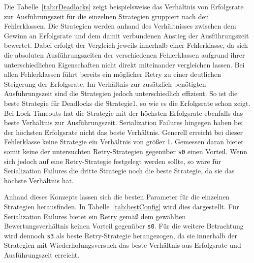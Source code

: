 Die Tabelle~\ref{tab:rDeadlocks} zeigt beispielsweise das Verhältnis von Erfolgsrate zur Ausführungszeit für die
einzelnen Strategien gruppiert nach den Fehlerklassen.
Die Strategien werden anhand des Verhältnisses zwischen dem Gewinn an Erfolgsrate und dem damit verbundenen Anstieg
der Ausführungszeit bewertet.
Dabei erfolgt der Vergleich jeweils innerhalb einer Fehlerklasse, da sich die absoluten Ausführungszeiten der
verschiedenen Fehlerklassen aufgrund ihrer unterschiedlichen Eigenschaften nicht direkt miteinander
vergleichen lassen.
Bei allen Fehlerklassen führt bereits ein möglicher Retry zu einer deutlichen Steigerung der Erfolgsrate.
Im Verhältnis zur zusätzlich benötigten Ausführungszeit sind die Strategien jedoch unterschiedlich effizient.
So ist die beste Strategie für Deadlocks die Strategie1, so wie es die Erfolgsrate schon zeigt.
Bei Lock Timeouts hat die Strategie mit der höchsten Erfolgsrate ebenfalls das beste Verhältnis zur Ausführungszeit.
Serialization Failures hingegen haben bei der höchsten Erfolgsrate nicht das beste Verhältnis.
Generell erreicht bei dieser Fehlerklasse keine Strategie ein Verhältnis von größer 1.
Gemessen daran bietet somit keine der untersuchten Retry-Strategien gegenüber \texttt{s0} einen Vorteil.
Wenn sich jedoch auf eine Retry-Strategie festgelegt werden sollte, so wäre für Serialization Failures die dritte
Strategie noch die beste Strategie, da sie das höchste Verhältnis hat.

Anhand dieses Konzepts lassen sich die besten Parameter für die einzelnen Strategien herausfinden.
In Tabelle~\ref{tab:bestConfig} wird dies dargestellt.
Für Serialization Failures bietet ein Retry gemäß dem gewählten Bewertungsverhältnis keinen Vorteil gegenüber
\texttt{s0}.
Für die weitere Betrachtung wird dennoch \texttt{s3} als beste Retry-Strategie herangezogen, da sie innerhalb der
Strategien mit Wiederholungsversuch das beste Verhältnis aus Erfolgsrate und Ausführungszeit erreicht.

